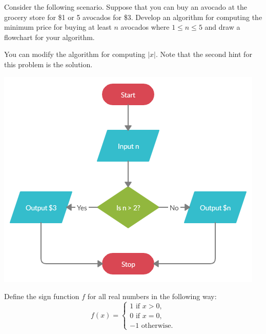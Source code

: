 \documentclass{ximera}
\begin{document}
\begin{question}
	Consider the following scenario. Suppose that you can buy an avocado at the grocery store for \$1 or 5 avocados for \$3. Develop an algorithm for computing the minimum price for buying at least $n$ avocados where $1\leq n\leq 5$ and draw a flowchart for your algorithm.
	\begin{hint}
		You can modify the algorithm for computing $|x|$. Note that the second hint for this problem is the solution.
	\end{hint}
	\begin{hint}
		\begin{center}
		\includegraphics{avocados.png}
		\end{center}
	\end{hint}
\end{question}

\begin{question}
	Define the sign function $f$ for all real numbers in the following way:
	$$ f(x) = \begin{cases} 1\text{ if $x>0$,}\\
                		0\text{ if $x=0$,}\\
			       -1\text{ otherwise.}
                  \end{cases}$$
\end{question}
\end{document}

